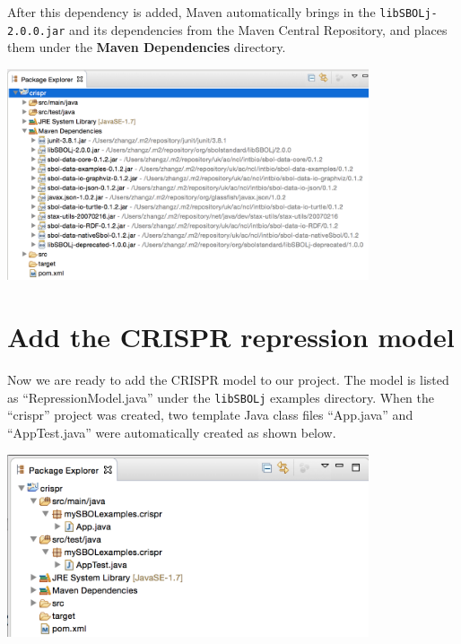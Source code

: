 After this dependency is added, Maven automatically brings in the  {\tt libSBOLj-2.0.0.jar} and its dependencies from the Maven Central Repository, and places them under the {\bf Maven Dependencies} directory.
\begin{center}
  \includegraphics[width=0.8\textwidth]{figures/addMavenDependency3}
\end{center}

\section*{Add the CRISPR repression model}
Now we are ready to add the CRISPR model to our project. The model is listed as ``RepressionModel.java''  under the {\tt libSBOLj} examples directory. When the ``crispr'' project was created, two template Java class files ``App.java'' and ``AppTest.java'' were automatically created as shown below. 
\begin{center}
  \includegraphics[width=0.8\textwidth]{figures/addCrisprModel1}
\end{center}

